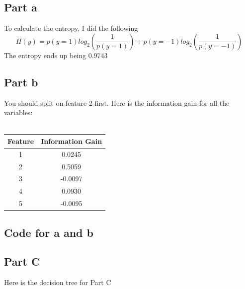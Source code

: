 \documentclass[twoside,11pt]{article}
\theoremstyle{definition}
\begin{document}
\subsection*{Part a}

To calculate the entropy, I did the following
\[
H(y) = p(y=1)log_2(\frac{1}{p(y=1)}) + p(y=-1)log_2(\frac{1}{p(y=-1)})
\]
The entropy ends up being $0.9743$
\\

\subsection*{Part b}

You should split on feature 2 first. Here is the information gain for all the variables:\\
\\
\begin{tabular}{ c | c }
  Feature & Information Gain\\
  \hline                       
  1 & 0.0245 \\
  2 & 0.5059 \\
  3 & -0.0097 \\
  4 & 0.0930 \\
  5 & -0.0095 \\      
\end{tabular}

\subsection*{Code for a and b}



\subsection*{Part C}

Here is the decision tree for Part C
\end{document}

